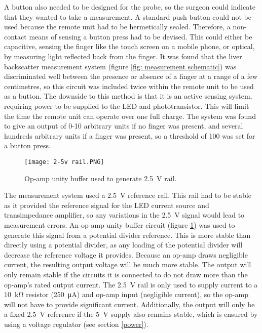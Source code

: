 A button also needed to be designed for the probe, so the surgeon could indicate that they wanted to take a measurement. A standard push button could not be used because the remote unit had to be hermetically sealed. Therefore, a non-contact means of sensing a button press had to be devised. This could either be capacitive, sensing the finger like the touch screen on a mobile phone, or optical, by measuring light reflected back from the finger. It was found that the liver backscatter measurement system (figure \ref{fig: measurement schematic}) was discriminated well between the presence or absence of a finger at a range of a few centimetres, so this circuit was included twice within the remote unit to be used as a button. The downside to this method is that it is an active sensing system, requiring power to be supplied to the LED and phototransistor. This will limit the time the remote unit can operate over one full charge. The system was found to give an output of 0-10 arbitrary units if no finger was present, and several hundreds arbitrary units if a finger was present, so a threshold of 100 was set for a button press. \\

\begin{figure}[htbp]
	\centering
	\texttt{[image: 2-5v rail.PNG]}
	\caption{Op-amp unity buffer used to generate \SI{2.5}{\volt} rail.}
	\label{fig: 2.5v rail}
\end{figure}

The measurement system used a \SI{2.5}{\volt} reference rail. This rail had to be stable as it provided the reference signal for the LED current source and transimpedance amplifier, so any variations in the \SI{2.5}{\volt} signal would lead to measurement errors. An op-amp unity buffer circuit (figure \ref{fig: 2.5v rail}) was used to generate this signal from a potential divider reference. This is more stable than directly using a potential divider, as any loading of the potential divider will decrease the reference voltage it provides. Because an op-amp draws negligible current, the resulting output voltage will be much more stable. The output will only remain stable if the circuits it is connected to do not draw more than the op-amp's rated output current. The \SI{2.5}{\volt} rail is only used to supply current to a \SI{10}{\kilo\ohm} resistor (\SI{250}{\micro\ampere}) and op-amp input (negligible current), so the op-amp will not have to provide significant current. Additionally, the output will only be a fixed \SI{2.5}{\volt} reference if the \SI{5}{\volt} supply also remains stable, which is ensured by using a voltage regulator (see section \ref{power}).\\




